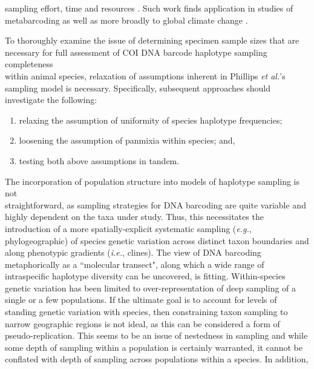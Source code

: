 sampling effort, time and resources \cite{hortal2005ed}. Such work finds application in studies of metabarcoding \cite{wares2015can} as well as more broadly to global climate change \cite{pfenninger2012methodological}.


To thoroughly examine the issue of determining specimen sample sizes that are \\ necessary for full assessment of COI DNA barcode haplotype sampling completeness \\ within animal species, relaxation of assumptions inherent in Phillips \textit{et al.}'s \cite{phillips2015exploration} sampling model is necessary. Specifically, subsequent approaches should investigate the following:

\begin{enumerate}

\item relaxing the assumption of uniformity of species haplotype frequencies;

\vspace{1mm}

\item loosening the assumption of panmixia within species; and,

\vspace{1mm}

\item testing both above assumptions in tandem.

\end{enumerate}

\noindent The incorporation of population structure into models of haplotype sampling is not \\ straightforward, as sampling strategies for DNA barcoding are quite variable and highly dependent on the taxa under study. Thus, this necessitates the introduction of a more spatially-explicit systematic sampling (\textit{e.g.}, phylogeographic) of species genetic variation across distinct taxon boundaries and along phenotypic gradients (\textit{i.e.}, clines). The view of DNA barcoding metaphorically as a ``molecular transect", along which a wide range of intraspecific haplotype diversity can be uncovered, is fitting. Within-species genetic variation has been limited to over-representation of deep sampling of a single or a few populations. If the ultimate goal is to account for levels of standing genetic variation with species, then constraining taxon sampling to narrow geographic regions is not ideal, as this can be considered a form of pseudo-replication. This seems to be an issue of nestedness in sampling and while some depth of sampling within a population is certainly warranted, it cannot be conflated with depth of sampling across populations within a species. In addition,

